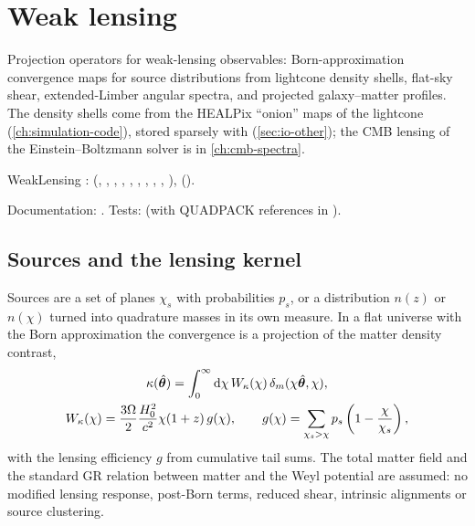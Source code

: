 \chapter{Weak lensing}\label{ch:weak-lensing}

Projection operators for weak-lensing observables: Born-approximation convergence maps for source distributions from
lightcone density shells, flat-sky shear, extended-Limber angular spectra, and projected galaxy--matter profiles. The density
shells come from the HEALPix ``onion'' maps of the  lightcone (\cref{ch:simulation-code}), stored sparsely
with  (\cref{sec:io-other}); the CMB lensing of the Einstein--Boltzmann solver is in \cref{ch:cmb-spectra}.

\begin{modulebox}{WeakLensing}
:  (, , , ,
, , , , ,
),  ().\par
Documentation: . Tests:  (with QUADPACK references in ).
\end{modulebox}

\section{Sources and the lensing kernel}\label{sec:wl-kernel}

Sources are a set of planes $\chi_s$ with probabilities $p_s$, or a distribution $n(z)$ or $n(\chi)$ turned into quadrature masses in its own
measure. In a flat universe with the Born approximation the convergence is a projection of the matter density contrast,
\begin{gather}
\kappa(\hat{\bm\theta})=\int_0^\infty\mathrm{d}\chi\,W_\kappa(\chi)\,\delta_m(\chi\hat{\bm\theta},\chi),\\
W_\kappa(\chi)=\frac{3\Omega}{2}\frac{H_0^2}{c^2}\chi(1+z)\,g(\chi),\qquad g(\chi)=\sum_{\chi_s>\chi}p_s\left(1-\frac{\chi}{\chi_s}\right),
\end{gather}
with the lensing efficiency $g$ from cumulative tail sums. The total matter field and the standard GR relation between matter and the Weyl potential are
assumed: no modified lensing response, post-Born terms, reduced shear, intrinsic alignments or source clustering.

